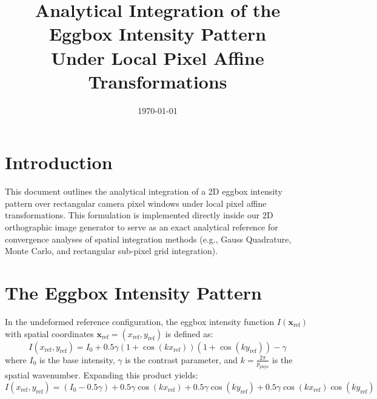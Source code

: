 \documentclass[11pt,a4paper]{article}
\title{Analytical Integration of the Eggbox Intensity Pattern\\Under Local Pixel Affine Transformations}
\date{\today}
\begin{document}
\maketitle

\section{Introduction}
This document outlines the analytical integration of a 2D eggbox intensity pattern over rectangular camera pixel windows under local pixel affine transformations. This formulation is implemented directly inside our 2D orthographic image generator to serve as an exact analytical reference for convergence analyses of spatial integration methods (e.g., Gauss Quadrature, Monte Carlo, and rectangular sub-pixel grid integration).

\section{The Eggbox Intensity Pattern}
In the undeformed reference configuration, the eggbox intensity function $I(\mathbf{x}_{\text{ref}})$ with spatial coordinates $\mathbf{x}_{\text{ref}} = (x_{\text{ref}}, y_{\text{ref}})$ is defined as:
\begin{equation}
I(x_{\text{ref}}, y_{\text{ref}}) = I_0 + 0.5\gamma(1 + \cos(k x_{\text{ref}}))(1 + \cos(k y_{\text{ref}})) - \gamma
\end{equation}
where $I_0$ is the base intensity, $\gamma$ is the contrast parameter, and $k = \frac{2\pi}{p_{\text{phys}}}$ is the spatial wavenumber. Expanding this product yields:
\begin{equation}
I(x_{\text{ref}}, y_{\text{ref}}) = (I_0 - 0.5\gamma) + 0.5\gamma\cos(k x_{\text{ref}}) + 0.5\gamma\cos(k y_{\text{ref}}) + 0.5\gamma\cos(k x_{\text{ref}})\cos(k y_{\text{ref}})
\end{equation}
\end{document}
